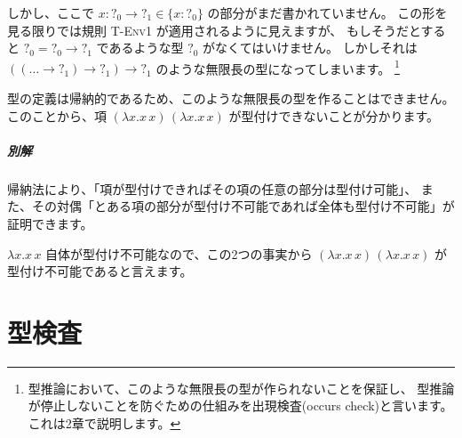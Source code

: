 \begin{exercise}
しかし、ここで $x : ?_0 \to ?_1 \in \{x : ?_0\}$ の部分がまだ書かれていません。
この形を見る限りでは規則 \textsc{T-Env1} が適用されるように見えますが、
もしそうだとすると $?_0 = ?_0 \to ?_1$ であるような型 $?_0$ がなくてはいけません。
しかしそれは $((\dots \to ?_1) \to ?_1) \to ?_1$ のような無限長の型になってしまいます。
\footnote{型推論において、このような無限長の型が作られないことを保証し、
型推論が停止しないことを防ぐための仕組みを出現検査(occurs check)と言います。
これは2章で説明します。}

型の定義は帰納的であるため、このような無限長の型を作ることはできません。
このことから、項 $(\lambda x . x \, x) \, (\lambda x . x \, x)$ が型付けできないことが分かります。

\subparagraph{別解}

帰納法により、「項が型付けできればその項の任意の部分は型付け可能」、
また、その対偶「とある項の部分が型付け不可能であれば全体も型付け不可能」が証明できます。

$\lambda x . x \, x$ 自体が型付け不可能なので、この2つの事実から
$(\lambda x . x \, x) \, (\lambda x . x \, x)$ が型付け不可能であると言えます。

\end{exercise}

\section{型検査}



